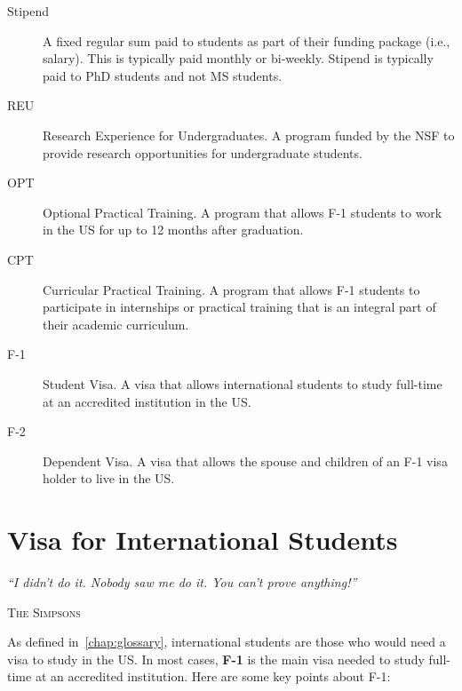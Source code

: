 \documentclass[oneside,11pt,dvipsnames]{book}
\newcommand{\myepigraphsimpsons}[1]{
\epigraph{\vspace{-0.2in} \emph{#1}}{\textsc{The Simpsons}}
}
\begin{document}
\begin{description}
        \item [Stipend] A fixed regular sum paid to students as part of their funding package (i.e., salary). This is typically paid monthly or bi-weekly.  Stipend is typically paid to PhD students and not MS students.
  \item[REU] Research Experience for Undergraduates. A program funded by the NSF to provide research opportunities for undergraduate students.
    \item[OPT] Optional Practical Training. A program that allows F-1 students to work in the US for up to 12 months after graduation.
  \item[CPT] Curricular Practical Training. A program that allows F-1 students to participate in internships or practical training that is an integral part of their academic curriculum.
  \item[F-1] Student Visa. A visa that allows international students to study full-time at an accredited institution in the US.
  \item[F-2] Dependent Visa. A visa that allows the spouse and children of an F-1 visa holder to live in the US.
\end{description}

\chapter{Visa for International Students}\label{chap:visa}

\myepigraphsimpsons{``I didn't do it. Nobody saw me do it. You can't prove anything!''}


As defined in~\autoref{chap:glossary}, international students are those who would need a visa to study in the US.  In most cases, \textbf{F-1} is the main visa needed to study full-time at an accredited institution.  Here are some key points about F-1: 
\end{document}

